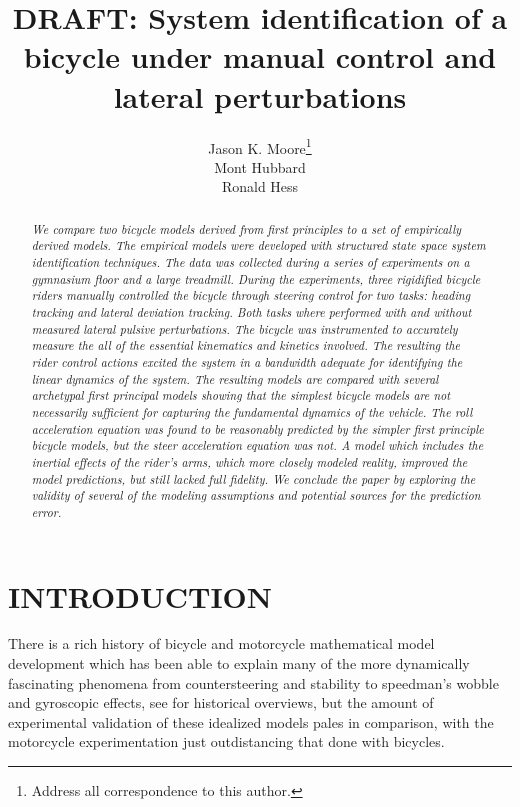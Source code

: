 \documentclass[twocolumn,10pt]{asme2e}
\title{DRAFT: System identification of a bicycle under manual control and
lateral perturbations}
\author{Jason K. Moore\thanks{Address all correspondence to this author.}\\
        {\tensfb Mont Hubbard}\\
				{\tensfb Ronald Hess}
    \affiliation{
    Department of Mechanical and Aerospace Engineering\\
    University of California\\
    Davis, California 95616\\
    Email: jkmoor@ucdavis.edu
    }
}
\begin{document}

\maketitle

\begin{abstract}
	\textit{We compare two bicycle models derived from first principles to a set
	of empirically derived models. The empirical models were developed with
	structured state space system identification techniques. The data was
	collected during a series of experiments on a gymnasium floor and a large
	treadmill. During the experiments, three rigidified bicycle riders manually
	controlled the bicycle through steering control for two tasks: heading
	tracking and lateral deviation tracking. Both tasks where performed with and
	without measured lateral pulsive perturbations. The bicycle was instrumented
	to accurately measure the all of the essential kinematics and kinetics
	involved. The resulting the rider control actions excited the system in a
	bandwidth adequate for identifying the linear dynamics of the system. The
	resulting models are compared with several archetypal first principal models
	showing that the simplest bicycle models are not necessarily sufficient for
	capturing the fundamental dynamics of the vehicle. The roll acceleration
	equation was found to be reasonably predicted by the simpler first principle
	bicycle models, but the steer acceleration equation was not. A model which
	includes the inertial effects of the rider’s arms, which more closely modeled
	reality, improved the model predictions, but still lacked full fidelity. We
	conclude the paper by exploring the validity of several of the modeling
	assumptions and potential sources for the prediction error.}
\end{abstract}

\section*{INTRODUCTION}

There is a rich history of bicycle and motorcycle mathematical model
development which has been able to explain many of the more dynamically
fascinating phenomena from countersteering and stability to speedman's wobble
and gyroscopic effects, see \cite{Limebeer2006, Meijaard2007} for historical
overviews, but the amount of experimental validation of these idealized models
pales in comparison, with the motorcycle experimentation just outdistancing
that done with bicycles.
\end{document}
